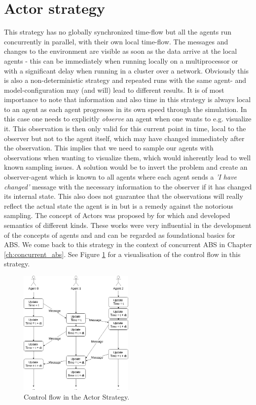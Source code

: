 \section{Actor strategy}
\label{sub:act_strategy}
This strategy has no globally synchronized time-flow but all the agents run concurrently in parallel, with their own local time-flow. The messages and changes to the environment are visible as soon as the data arrive at the local agents - this can be immediately when running locally on a multiprocessor or with a significant delay when running in a cluster over a network. Obviously this is also a non-deterministic strategy and repeated runs with the same agent- and model-configuration may (and will) lead to different results. It is of most importance to note that information and also time in this strategy is always local to an agent as each agent progresses in its own speed through the simulation. In this case one needs to explicitly \textit{observe} an agent when one wants to e.g. visualize it. This observation is then only valid for this current point in time, local to the observer but not to the agent itself, which may have changed immediately after the observation. This implies that we need to sample our agents with observations when wanting to visualize them, which would inherently lead to well known sampling issues. A solution would be to invert the problem and create an observer-agent which is known to all agents where each agent sends a \textit{'I have changed'} message with the necessary information to the observer if it has changed its internal state. This also does not guarantee that the observations will really reflect the actual state the agent is in but is a remedy against the notorious sampling. The concept of Actors was proposed by \cite{hewitt_universal_1973} for which \cite{grief_semantics_1975} and \cite{clinger_foundations_1981} developed semantics of different kinds. These works were very influential in the development of the concepts of agents and and can be regarded as foundational basics for ABS. We come back to this strategy in the context of concurrent ABS in Chapter \ref{ch:concurrent_abs}. See Figure \ref{fig:strategy_act} for a visualisation of the control flow in this strategy.

\begin{figure}[H]
	\centering
	\includegraphics[width=0.5\textwidth, angle=0]{./fig/implabs/actor.png}
	\caption{Control flow in the Actor Strategy.}
	\label{fig:strategy_act}
\end{figure}

